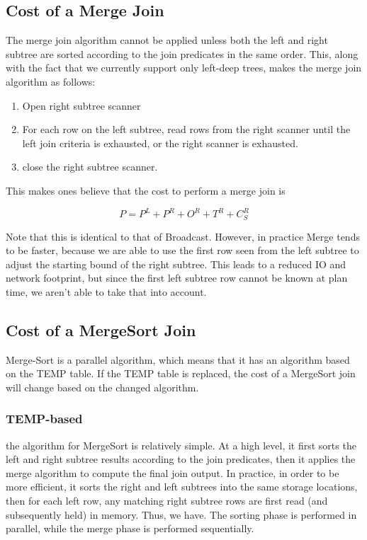 \documentclass[10pt]{amsart}
\begin{document}
\subsection{Cost of a Merge Join}
The merge join algorithm cannot be applied unless both the left and right subtree are sorted according to the join predicates in the same order. This, along with the fact that we currently support only left-deep trees, makes the merge join algorithm as follows:

\begin{enumerate}
				\item Open right subtree scanner
				\item For each row on the left subtree, read rows from the right scanner until the left join criteria is exhausted, or the right scanner is exhausted.
				\item close the right subtree scanner.
\end{enumerate}

This makes ones believe that the cost to perform a merge join is

\begin{equation}
P = P^L + P^R+O^R+T^R+C_S^R
\end{equation}

Note that this is identical to that of Broadcast. However, in practice Merge tends to be faster, because we are able to use the first row seen from the left subtree to adjust the starting bound of the right subtree. This leads to a reduced IO and network footprint, but since the first left subtree row cannot be known at plan time, we aren't able to take that into account.

\subsection{Cost of a MergeSort Join}
Merge-Sort is a parallel algorithm, which means that it has an algorithm based on the TEMP table. If the TEMP table is replaced, the cost of a MergeSort join will change based on the changed algorithm.

\subsubsection{TEMP-based}
the algorithm for MergeSort is relatively simple. At a high level, it first sorts the left and right subtree results according to the join predicates, then it applies the merge algorithm to compute the final join output. In practice, in order to be more efficient, it sorts the right and left subtrees into the same storage locations, then for each left row, any matching right subtree rows are first read (and subsequently held) in memory. Thus, we have. The sorting phase is performed in parallel, while the merge phase is performed sequentially.
\end{document}
